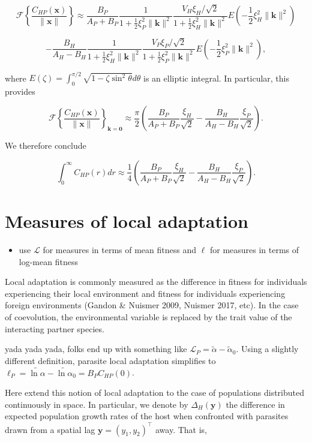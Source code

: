 \documentclass{article}
\begin{document}
\[\mathcal F\left\{\frac{C_{HP}(\pmb x)}{\|\pmb x\|}\right\}\approx\frac{B_P}{A_P+B_P}\frac{1}{1+\frac{1}{2}\xi_P^2\|\pmb k\|^2} \frac{V_H\xi_H/\sqrt2}{1+\frac{1}{2}\xi_H^2\|\pmb k\|^2}E\left(-\frac{1}{2}\xi_H^2\|\pmb k\|^2\right)\]

\[-\frac{B_H}{A_H-B_H}\frac{1}{1+\frac{1}{2}\xi_H^2\|\pmb k\|^2} \frac{V_P\xi_P/\sqrt2}{1+\frac{1}{2}\xi_P^2\|\pmb k\|^2}E\left(-\frac{1}{2}\xi_P^2\|\pmb k\|^2\right),\]

where \(E(\zeta)=\int_0^{\pi/2}\sqrt{1-\zeta\sin^2\theta}d\theta\) is an
elliptic integral. In particular, this provides

\[\mathcal F\left\{\frac{C_{HP}(\pmb x)}{\|\pmb x\|}\right\}_{\pmb k=\pmb 0}\approx\frac{\pi}{2}\left(\frac{B_P}{A_P+B_P}\frac{\xi_H}{\sqrt2}-\frac{B_H}{A_H-B_H}\frac{\xi_P}{\sqrt2}\right).\]

We therefore conclude

\[\int_0^\infty C_{HP}(r)dr\approx\frac{1}{4}\left(\frac{B_P}{A_P+B_P}\frac{\xi_H}{\sqrt2}-\frac{B_H}{A_H-B_H}\frac{\xi_P}{\sqrt2}\right).\]

\hypertarget{measures-of-local-adaptation}{%
\section{Measures of local
adaptation}\label{measures-of-local-adaptation}}

\begin{itemize}
\tightlist
\item
  use \(\mathcal L\) for measures in terms of mean fitness and \(\ell\)
  for measures in terms of log-mean fitness
\end{itemize}

Local adaptation is commonly measured as the difference in fitness for
individuals experiencing their local environment and fitness for
individuals experiencing foreign environments (Gandon \& Nuismer 2009,
Nuismer 2017, etc). In the case of coevolution, the environmental
variable is replaced by the trait value of the interacting partner
species.

yada yada yada, folks end up with something like
\(\mathcal L_P=\tilde\alpha-\tilde\alpha_0\). Using a slightly different
definition, parasite local adaptation simplifies to
\(\ell_P=\widetilde{\ln\alpha}-\widetilde{\ln\alpha}_0=B_PC_{HP}(0)\).

Here extend this notion of local adaptation to the case of populations
distributed continuously in space. In particular, we denote by
\(\Delta_H(\pmb y)\) the difference in expected population growth rates
of the host when confronted with parasites drawn from a spatial lag
\(\pmb y=(y_1,y_2)^\top\) away. That is,
\end{document}

